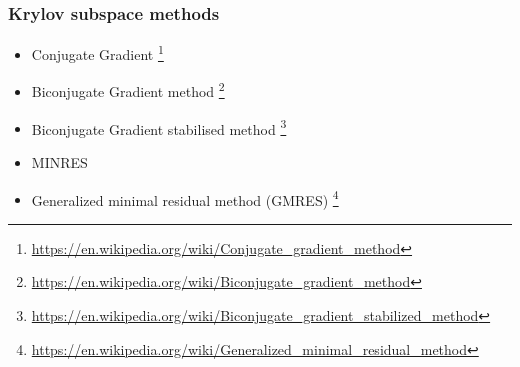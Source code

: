 

\subsubsection{Krylov subspace methods}

\begin{itemize}
\item Conjugate Gradient
\footnote{\url{https://en.wikipedia.org/wiki/Conjugate_gradient_method}} 
\item Biconjugate Gradient method
\footnote{\url{https://en.wikipedia.org/wiki/Biconjugate_gradient_method}}
\item Biconjugate Gradient stabilised method
\footnote{\url{https://en.wikipedia.org/wiki/Biconjugate_gradient_stabilized_method}}
\item MINRES
\item Generalized minimal residual method (GMRES)
\footnote{\url{https://en.wikipedia.org/wiki/Generalized_minimal_residual_method}}
\end{itemize}





